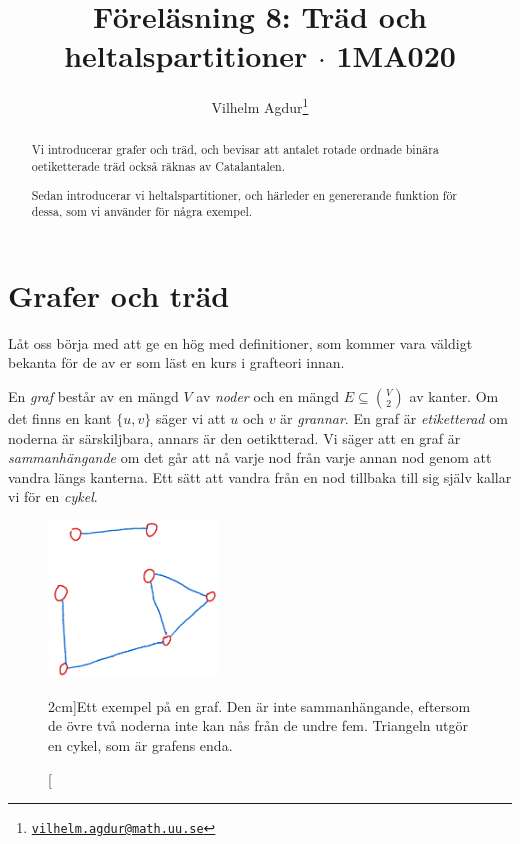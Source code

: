 \documentclass[nobib]{tufte-handout}
\title{Föreläsning 8: Träd och heltalspartitioner $\cdot$ 1MA020}
\author[Vilhelm Agdur]{Vilhelm Agdur\thanks{\href{mailto:vilhelm.agdur@math.uu.se}{\nolinkurl{vilhelm.agdur@math.uu.se}}}}
\begin{document}

\maketitle%

\begin{abstract}
\noindent
Vi introducerar grafer och träd, och bevisar att antalet rotade ordnade binära oetiketterade träd också räknas av Catalantalen.

Sedan introducerar vi heltalspartitioner, och härleder en genererande funktion för dessa, som vi använder för några exempel.
\end{abstract}

\section{Grafer och träd}

Låt oss börja med att ge en hög med definitioner, som kommer vara väldigt bekanta för de av er som läst en kurs i grafteori innan.

\begin{definition}
    En \emph{graf} består av en mängd $V$ av \emph{noder} och en mängd $E \subseteq \binom{V}{2}$ av kanter. Om det finns en kant $\{u,v\}$ säger vi att $u$ och $v$ är \emph{grannar}. En graf är \emph{etiketterad} om noderna är särskiljbara, annars är den oetiktterad. Vi säger att en graf är \emph{sammanhängande} om det går att nå varje nod från varje annan nod genom att vandra längs kanterna. Ett sätt att vandra från en nod tillbaka till sig själv kallar vi för en \emph{cykel}.

    \begin{figure}
        \centering
        \includegraphics[width=0.4\textwidth]{graphics/example_graph.png}
        \caption[][2cm]{Ett exempel på en graf. Den är inte sammanhängande, eftersom de övre två noderna inte kan nås från de undre fem. Triangeln utgör en cykel, som är grafens enda.}
    \end{figure}
\end{definition}
\end{document}
